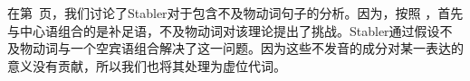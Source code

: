 \noindent
在第~\pageref{Beispiel-leeres-Element-intransitive-Verben}页，我们讨论了Stabler对于包含不及物动词句子的分析。因为，按照 \citet[]{Chomsky2008a}，首先与中心语组合的是补足语，不及物动词对该理论提出了挑战。Stabler通过假设不及物动词与一个空宾语组合解决了这一问题\citep[,124]{Veenstra98a}。因为这些不发音的成分对某一表达的意义没有贡献，所以我们也将其处理为虚位代词。

